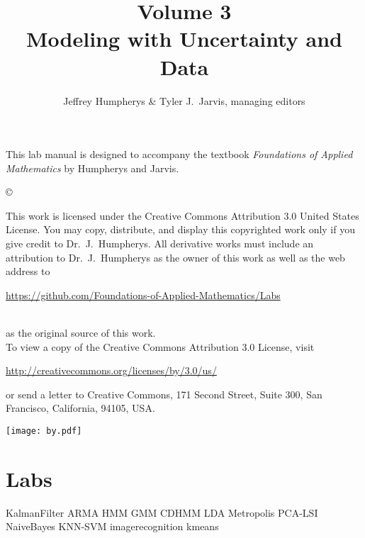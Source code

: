 \documentclass[opener-c,labs,yellow,nociteref]{HJnewsiambook}
\title{Volume 3\\ Modeling with Uncertainty and Data}
\author{Jeffrey Humpherys \& Tyler J.~Jarvis, managing editors}
\begin{document}

\thispagestyle{empty} %
\maketitle
\thispagestyle{empty}
\frontmatter



\begin{thepreface} %

This lab manual is designed to accompany the textbook \emph{Foundations of Applied Mathematics} by Humpherys and Jarvis.

\vfill
\copyright{This work is licensed under the Creative Commons Attribution 3.0 United States License.
You may copy, distribute, and display this copyrighted work only if you give credit to Dr.~J.~Humpherys.
All derivative works must include an attribution to Dr.~J.~Humpherys as the owner of this work as well as the web address to
\\\centerline{\url{https://github.com/Foundations-of-Applied-Mathematics/Labs}}\\as the original source of this work.
\\To view a copy of the Creative Commons Attribution 3.0 License, visit
\\\centerline{\url{http://creativecommons.org/licenses/by/3.0/us/}} or send a letter to Creative Commons, 171 Second Street, Suite 300, San Francisco, California, 94105, USA.}

\vfill
\centering\texttt{[image: by.pdf]}
\vfill
\end{thepreface}

\setcounter{tocdepth}{1}
\tableofcontents

\mainmatter %

\part{Labs} %
{KalmanFilter}
{ARMA}
{HMM}
{GMM}
{CDHMM}
{LDA}
{Metropolis}
{PCA-LSI}
{NaiveBayes}
{KNN-SVM}
{imagerecognition}
{kmeans}
\end{document}
